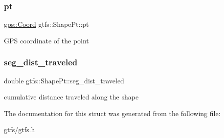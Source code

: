 \subsubsection{\texorpdfstring{pt}{pt}}
{\footnotesize\ttfamily \hyperlink{classgps_1_1Coord}{gps\+::\+Coord} gtfs\+::\+Shape\+Pt\+::pt}

G\+PS coordinate of the point \mbox{\label{structgtfs_1_1ShapePt_ad3fe477575279af15fe33e0ce36eaad2}} 
\subsubsection{\texorpdfstring{seg\+\_\+dist\+\_\+traveled}{seg\_dist\_traveled}}
{\footnotesize\ttfamily double gtfs\+::\+Shape\+Pt\+::seg\+\_\+dist\+\_\+traveled}

cumulative distance traveled along the shape 

The documentation for this struct was generated from the following file\+:\begin{DoxyCompactItemize}
\item 
gtfs/gtfs.\+h\end{DoxyCompactItemize}
